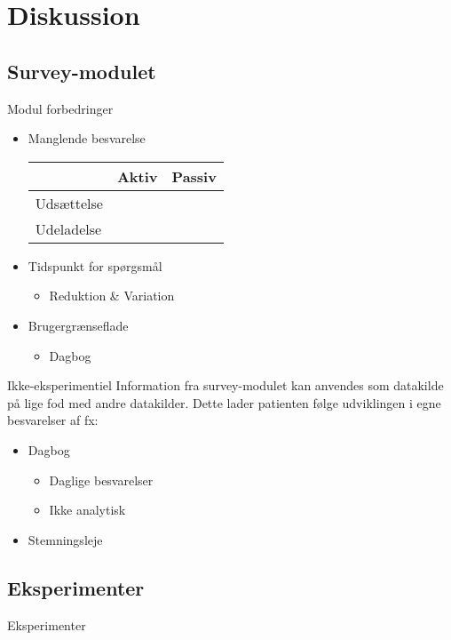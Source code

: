 \section{Diskussion}
\subsection{Survey-modulet}
\begin{frame}{Modul forbedringer}
\begin{itemize}
\item Manglende besvarelse\\
\begin{tabular}{|l|l|l|}\cline{2-3}
\multicolumn{1}{l|}{} & Aktiv & Passiv\\\hline
Udsættelse & & \\\hline
Udeladelse & & \\\hline
\end{tabular}
\end{itemize}
\begin{itemize}
\item Tidspunkt for spørgsmål
\begin{itemize}
\item Reduktion \& Variation
\end{itemize}
\item Brugergrænseflade
\begin{itemize}
\item Dagbog
\end{itemize}
\end{itemize}
\end{frame}

\begin{frame}{Ikke-eksperimentiel}
Information fra survey-modulet kan anvendes som datakilde på lige fod med andre datakilder.
Dette lader patienten følge udviklingen i egne besvarelser af fx:
\begin{itemize}
\pause
\item Dagbog
\begin{itemize}
\item Daglige besvarelser
\item Ikke analytisk
\end{itemize}
\pause
\item Stemningsleje\\

\end{itemize}
\end{frame}

\subsection{Eksperimenter}

\begin{frame}{Eksperimenter}

\end{frame}


